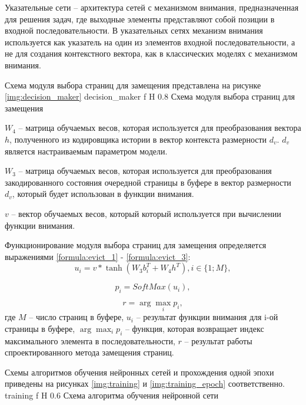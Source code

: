 Указательные сети -- архитектура сетей с механизмом внимания, предназначенная для решения задач, где выходные элементы представляют собой позиции в входной последовательности.
В указательных сетях механизм внимания используется как указатель на один из элементов входной последовательности, а не для создания контекстного вектора, как в классических моделях с механизмом внимания.

Схема модуля выбора страниц для замещения представлена на рисунке \ref{img:decision_maker}
{decision_maker} %
{f} %
{H} %
{0.8\textwidth} %
{Схема модуля выбора страниц для замещения} %

$W_4$ -- матрица обучаемых весов, которая используется для преобразования вектора $h$, полученного из кодировщика истории в вектор контекста размерности $d_v$. $d_v$ является настраиваемым параметром модели.

$W_3$ -- матрица обучаемых весов, которая используется для преобразования закодированного состояния очередной страницы в буфере в вектор размерности $d_v$, который будет использован в функции внимания.

$v$ -- вектор обучаемых весов, который который используется при вычислении функции внимания.

Функционирование модуля выбора страниц для замещения определяется выражениями \ref{formula:evict_1} - \ref{formula:evict_3}:
\begin{equation}\label{formula:evict_1}
	u_i = v * \tanh(W_3 b_i^T + W_4 h^T), i \in \{1; M\},
\end{equation}

\begin{equation}\label{formula:evict_2}
	p_i = SoftMax(u_i),
\end{equation}

\begin{equation}\label{formula:evict_3}
	r = \arg\max_{i} p_i,
\end{equation}
где $M$ -- число страниц в буфере, $u_i$ -- результат функции внимания для i-ой страницы в буфере, $\arg\max_{i} p_i$ -- функция, которая возвращает индекс максимального элемента в последовательности, $r$ -- результат работы спроектированного метода замещения страниц.

Схемы алгоритмов обучения нейронных сетей и прохождения одной эпохи приведены на рисунках \ref{img:training} и \ref{img:training_epoch} соответственно.
{training} %
{f} %
{H} %
{0.6\textwidth} %
{Схема алгоритма обучения нейронной сети} %

